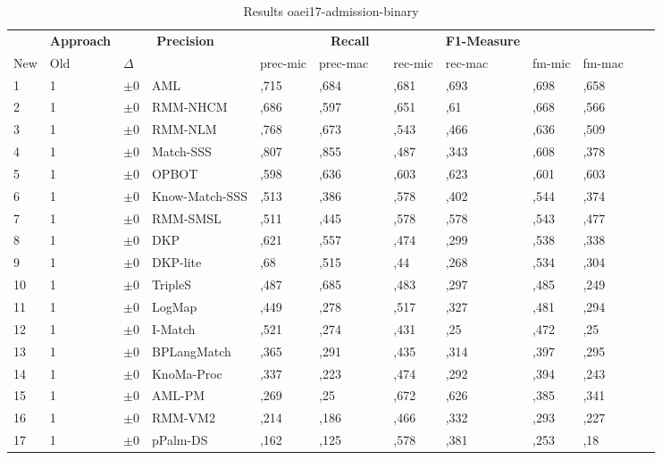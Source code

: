 \begin{table}[htb]
\setlength{\tabcolsep}{0.5em}
\centering
\scriptsize
\begin{tabular}[tb]{lllp{2.3cm}llllllllll}
\noalign{\smallskip}\hline\noalign{\smallskip}
\multicolumn{3}{c}{\textbf{Rank}}& \textbf{Approach}  & \multicolumn{2}{c}{\textbf{Precision}}  & \hspace*{1mm}  & \multicolumn{2}{c}{\textbf{Recall}}  & \hspace*{1mm}  & \multicolumn{2}{c}{\textbf{F1-Measure}}  & \hspace*{1mm} \\
New & Old & $\Delta$ & &prec-mic & prec-mac && rec-mic & rec-mac && fm-mic & fm-mac\\
\noalign{\smallskip}\hline\noalign{\smallskip}
1 & 1 		& $\pm$0 &AML    	&	,715 & ,684 & & ,681 & ,693 & & ,698 & ,658\\
2 & 1 		& $\pm$0 &RMM-NHCM    	&	,686 & ,597 & & ,651 & ,61 & & ,668 & ,566\\
3 & 1 		& $\pm$0 &RMM-NLM    	&	,768 & ,673 & & ,543 & ,466 & & ,636 & ,509\\
4 & 1 		& $\pm$0 &Match-SSS    	&	,807 & ,855 & & ,487 & ,343 & & ,608 & ,378\\
5 & 1 		& $\pm$0 &OPBOT    	&	,598 & ,636 & & ,603 & ,623 & & ,601 & ,603\\
6 & 1 		& $\pm$0 &Know-Match-SSS    	&	,513 & ,386 & & ,578 & ,402 & & ,544 & ,374\\
7 & 1 		& $\pm$0 &RMM-SMSL    	&	,511 & ,445 & & ,578 & ,578 & & ,543 & ,477\\
8 & 1 		& $\pm$0 &DKP    	&	,621 & ,557 & & ,474 & ,299 & & ,538 & ,338\\
9 & 1 		& $\pm$0 &DKP-lite    	&	,68 & ,515 & & ,44 & ,268 & & ,534 & ,304\\
10 & 1 		& $\pm$0 &TripleS    	&	,487 & ,685 & & ,483 & ,297 & & ,485 & ,249\\
11 & 1 		& $\pm$0 &LogMap    	&	,449 & ,278 & & ,517 & ,327 & & ,481 & ,294\\
12 & 1 		& $\pm$0 &I-Match    	&	,521 & ,274 & & ,431 & ,25 & & ,472 & ,25\\
13 & 1 		& $\pm$0 &BPLangMatch    	&	,365 & ,291 & & ,435 & ,314 & & ,397 & ,295\\
14 & 1 		& $\pm$0 &KnoMa-Proc    	&	,337 & ,223 & & ,474 & ,292 & & ,394 & ,243\\
15 & 1 		& $\pm$0 &AML-PM    	&	,269 & ,25 & & ,672 & ,626 & & ,385 & ,341\\
16 & 1 		& $\pm$0 &RMM-VM2    	&	,214 & ,186 & & ,466 & ,332 & & ,293 & ,227\\
17 & 1 		& $\pm$0 &pPalm-DS    	&	,162 & ,125 & & ,578 & ,381 & & ,253 & ,18\\
\end{tabular}
\caption{Results oaei17-admission-binary}
\label{tbl:results}
\end{table}